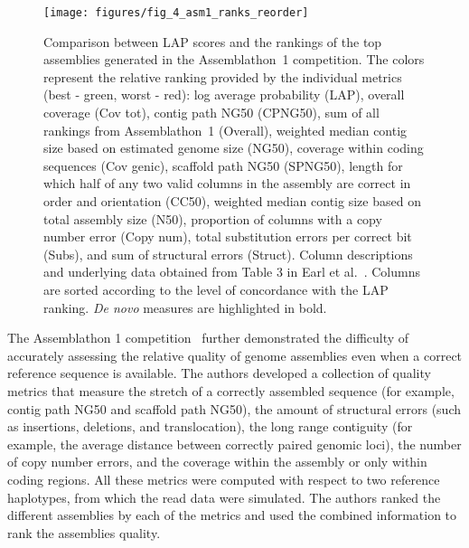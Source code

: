 \begin{figure}[ht!]
\begin{center}
\texttt{[image: figures/fig\_4\_asm1\_ranks\_reorder]}
\end{center}
\renewcommand{\baselinestretch}{1}
\small\normalsize
\begin{quote}
\caption[Comparison between LAP scores and the rankings of the
    top assemblies generated in the Assemblathon~1 competition.]
    {Comparison between LAP scores and the rankings of the
    top assemblies generated in the Assemblathon~1 competition.
    The
    colors represent the relative ranking provided by the individual
    metrics (best - green, worst - red):
    log average probability (LAP),
    overall coverage (Cov tot),
    contig path NG50 (CPNG50),
    sum of all rankings from Assemblathon~1 (Overall),
    weighted median contig size based on estimated genome size (NG50),
    coverage within coding sequences (Cov genic),
    scaffold path NG50 (SPNG50),
    length for which half of any two valid columns in the assembly are correct in order and orientation (CC50),
    weighted median contig size based on total assembly size (N50),
    proportion of columns with a copy number error (Copy num),
    total substitution errors per correct bit (Subs),
    and sum of structural errors (Struct).
    Column descriptions and underlying data
    obtained from Table 3 in Earl et al.~\cite{earl2011assemblathon}.
    Columns are sorted according to the level of concordance with the
   LAP ranking.  \emph{De novo} measures are highlighted in bold.}
\label{fig:asm1_ranks}
\end{quote}
\end{figure}
\renewcommand{\baselinestretch}{2}
\small\normalsize

The Assemblathon 1 competition~\cite{earl2011assemblathon} further demonstrated the difficulty of accurately assessing the relative quality of genome
assemblies even when a correct reference sequence is available.
The authors developed a collection of quality metrics that measure the
stretch of a correctly assembled sequence (for example, contig path NG50 and scaffold
path NG50), the amount of structural errors (such as insertions,
deletions, and translocation), the long range contiguity (for example, the
average distance between correctly paired genomic loci), the number of copy number
errors, and the coverage within the assembly or only within coding
regions.  All these metrics were computed with respect to two
reference haplotypes, from which the read data were
simulated.  The authors ranked the different assemblies by each of the metrics and used the combined information to rank the
assemblies quality.

